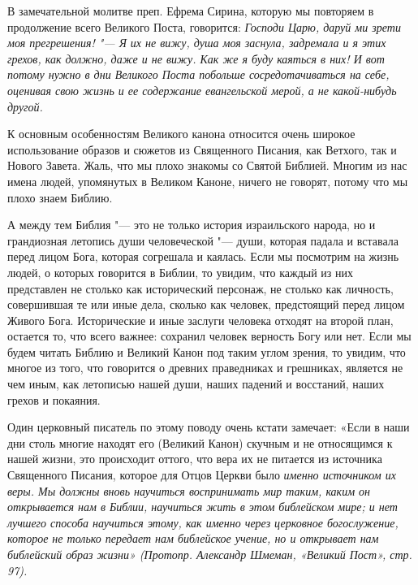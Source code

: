 В замечательной молитве преп. Ефрема Сирина,
которую мы повторяем в продолжение всего
Великого Поста, говорится: \itshape Господи Царю, даруй
ми зрети моя прегрешения!\normalfont{} "--- Я их не вижу, душа
моя заснула, задремала и я этих грехов, как
должно, даже и не вижу. Как же я буду каяться в них!
И вот потому нужно в дни Великого Поста побольше
сосредотачиваться на себе, оценивая свою жизнь и
ее содержание евангельской мерой, а не
какой-нибудь другой. 


К основным особенностям Великого канона
относится очень широкое использование образов и
сюжетов из Священного Писания, как Ветхого, так и
Нового Завета. Жаль, что мы плохо знакомы со
Святой Библией. Многим из нас имена людей,
упомянутых в Великом Каноне, ничего не говорят,
потому что мы плохо знаем Библию. 


А между тем Библия "--- это не только история
израильского народа, но и грандиозная летопись
души человеческой "--- души, которая падала и
вставала перед лицом Бога, которая согрешала и
каялась. Если мы посмотрим на жизнь людей, о
которых говорится в Библии, то увидим, что каждый
из них представлен не столько как исторический
персонаж, не столько как личность, совершившая те
или иные дела, сколько как человек, предстоящий
перед лицом Живого Бога. Исторические и иные
заслуги человека отходят на второй план,
остается то, что всего важнее: сохранил человек
верность Богу или нет. Если мы будем читать
Библию и Великий Канон под таким углом зрения, то
увидим, что многое из того, что говорится о
древних праведниках и грешниках, является не чем
иным, как летописью нашей души, наших падений и
восстаний, наших грехов и покаяния.


Один церковный писатель по этому поводу очень
кстати замечает: «Если в наши дни столь многие
находят его (Великий Канон) скучным и не
относящимся к нашей жизни, это происходит оттого,
что вера их не питается из источника Священного
Писания, которое для Отцов Церкви было \itshape именно\normalfont{}
источником их веры. Мы должны вновь научиться
воспринимать мир таким, каким он открывается нам
в Библии, научиться жить в этом библейском мире; и
нет лучшего способа научиться этому, как именно
через церковное богослужение, которое не только
передает нам библейское учение, но и открывает
нам библейский образ жизни» (Протопр. Александр
Шмеман, «Великий Пост», стр. 97).


